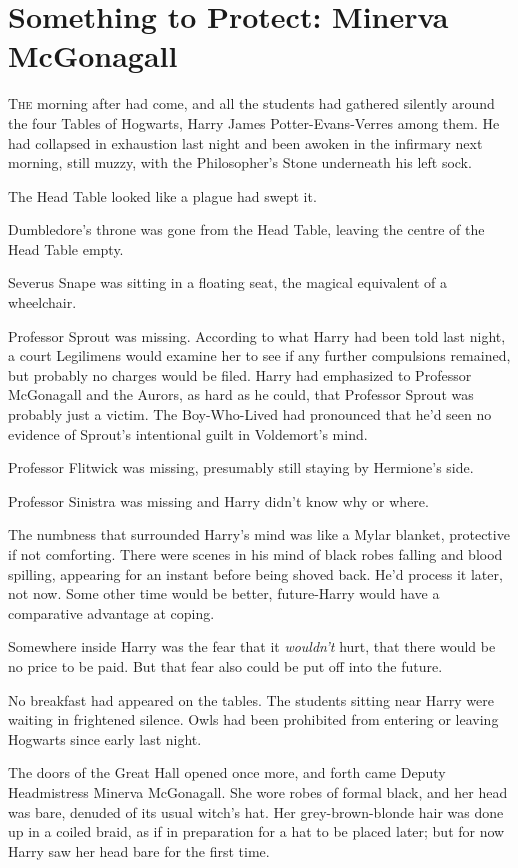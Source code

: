 \chapter{Something to Protect: Minerva McGonagall}

\lettrine{T}{he} morning after had come, and all the students had gathered silently around the four Tables of Hogwarts, Harry James Potter-Evans-Verres among them. He had collapsed in exhaustion last night and been awoken in the infirmary next morning, still muzzy, with the Philosopher's Stone underneath his left sock.

The Head Table looked like a plague had swept it.

Dumbledore's throne was gone from the Head Table, leaving the centre of the Head Table empty.

Severus Snape was sitting in a floating seat, the magical equivalent of a wheelchair.

Professor Sprout was missing. According to what Harry had been told last night, a court Legilimens would examine her to see if any further compulsions remained, but probably no charges would be filed. Harry had emphasized to Professor McGonagall and the Aurors, as hard as he could, that Professor Sprout was probably just a victim. The Boy-Who-Lived had pronounced that he'd seen no evidence of Sprout's intentional guilt in Voldemort's mind.

Professor Flitwick was missing, presumably still staying by Hermione's side.

Professor Sinistra was missing and Harry didn't know why or where.

The numbness that surrounded Harry's mind was like a Mylar blanket, protective if not comforting. There were scenes in his mind of black robes falling and blood spilling, appearing for an instant before being shoved back. He'd process it later, not now. Some other time would be better, future-Harry would have a comparative advantage at coping.

Somewhere inside Harry was the fear that it \emph{wouldn't} hurt, that there would be no price to be paid. But that fear also could be put off into the future.

No breakfast had appeared on the tables. The students sitting near Harry were waiting in frightened silence. Owls had been prohibited from entering or leaving Hogwarts since early last night.

The doors of the Great Hall opened once more, and forth came Deputy Headmistress Minerva McGonagall. She wore robes of formal black, and her head was bare, denuded of its usual witch's hat. Her grey-brown-blonde hair was done up in a coiled braid, as if in preparation for a hat to be placed later; but for now Harry saw her head bare for the first time.

